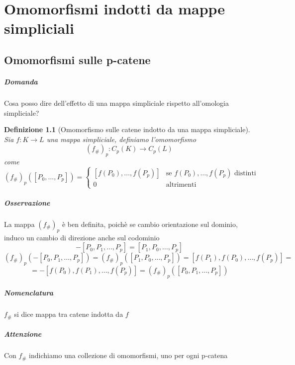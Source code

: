 \documentclass[a4paper]{report}
\newtheorem{definition}{Definizione}
\newcommand{\ra}{\ensuremath{\rightarrow}}
\newcommand{\shrp}[1]{\ensuremath{({#1}_\#)_p}}
\begin{document}
\chapter{Omomorfismi indotti da mappe simpliciali}
\section{Omomorfismi sulle p-catene}
\paragraph{Domanda} Cosa posso dire dell'effetto di una mappa simpliciale rispetto all'omologia simpliciale?
\begin{definition}[Omomorfismo sulle catene indotto da una mappa simpliciale]
    Sia $f:K\ra L$ una mappa simpliciale, definiamo l'omomorfismo
    \[
        \shrp{f}:C_p(K)\ra C_p(L)
    \]
    come
    \[
        \shrp{f}([P_0,\dots,P_p])=\begin{cases}
            [f(P_0),\dots,f(P_p)] & \text{se } f(P_0),\dots,f(P_p)\text{ distinti} \\
            0                     & \text{altrimenti}
        \end{cases}
    \]
\end{definition}
\paragraph{Osservazione} La mappa \shrp{f} è ben definita, poichè se cambio orientazione sul dominio, induco un cambio di direzione anche sul codominio
\[
    -[P_0,P_1,\dots,P_p]=[P_1,P_0,\dots,P_p]
\]
\[
    \shrp{f}(-[P_0,P_1,\dots,P_p])=\shrp{f}([P_1,P_0,\dots,P_p])=[f(P_1),f(P_0),\dots,f(P_p)]=
\]
\[
    =-[f(P_0),f(P_1),\dots,f(P_p)]=\shrp{f}([P_0,P_1,\dots,P_p])
\]
\paragraph{Nomenclatura} $f_\#$ si dice mappa tra catene indotta da $f$
\paragraph{Attenzione} Con $f_\#$ indichiamo una collezione di omomorfismi, uno per ogni p-catena
\end{document}

